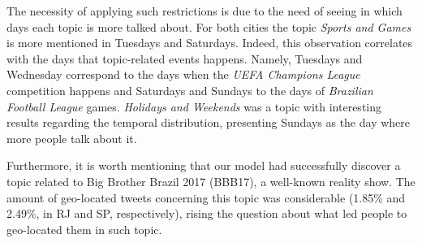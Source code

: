 The necessity of applying such restrictions is due to the need of seeing in which days each topic is more talked about. For both cities the topic \textit{Sports and Games} is more mentioned in Tuesdays and Saturdays. Indeed, this observation correlates with the days that topic-related events happens. Namely, Tuesdays and Wednesday correspond to the days when the \textit{UEFA Champions League} competition happens and Saturdays and Sundays to the days of \textit{Brazilian Football League} games. \textit{Holidays and Weekends} was a topic with interesting results regarding the temporal distribution, presenting Sundays as the day where more people talk about it. 

Furthermore, it is worth mentioning that our model had successfully discover a topic related to Big Brother Brazil 2017 (BBB17), a well-known reality show. The amount of geo-located tweets concerning this topic was considerable (1.85\% and 2.49\%, in RJ and SP, respectively), rising the question about what led people to geo-located them in such topic.

